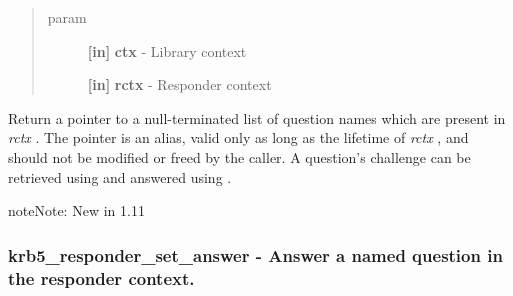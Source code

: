 \documentclass[letterpaper,10pt,english]{sphinxmanual}
\begin{document}
\begin{fulllineitems}
\label{appdev/refs/api/krb5_responder_list_questions:krb5_responder_list_questions}
\end{fulllineitems}

\begin{quote}\begin{description}
\item[{param}] \leavevmode
\textbf{{[}in{]}} \textbf{ctx} - Library context

\textbf{{[}in{]}} \textbf{rctx} - Responder context

\end{description}\end{quote}

Return a pointer to a null-terminated list of question names which are present in \emph{rctx} . The pointer is an alias, valid only as long as the lifetime of \emph{rctx} , and should not be modified or freed by the caller. A question's challenge can be retrieved using {\hyperref[appdev/refs/api/krb5_responder_get_challenge:krb5_responder_get_challenge]{}} and answered using {\hyperref[appdev/refs/api/krb5_responder_set_answer:krb5_responder_set_answer]{}} .

\begin{notice}{note}{Note:}
New in 1.11
\end{notice}


\subsubsection{krb5\_responder\_set\_answer -  Answer a named question in the responder context.}
\label{appdev/refs/api/krb5_responder_set_answer:krb5-responder-set-answer-answer-a-named-question-in-the-responder-context}\label{appdev/refs/api/krb5_responder_set_answer::doc}

\begin{fulllineitems}
\label{appdev/refs/api/krb5_responder_set_answer:krb5_responder_set_answer}
\end{fulllineitems}
\end{document}
